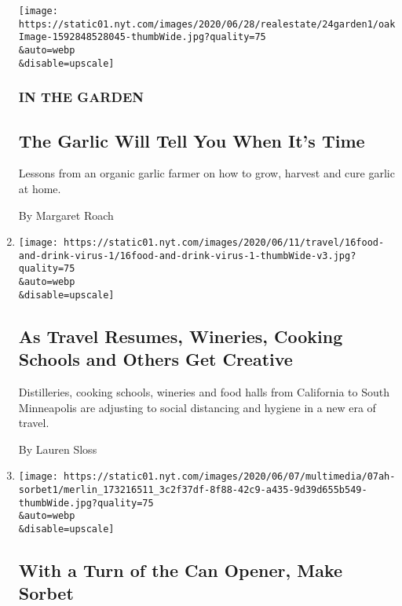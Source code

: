 \begin{enumerate}
  \texttt{[image: https://static01.nyt.com/images/2020/06/28/realestate/24garden1/oakImage-1592848528045-thumbWide.jpg?quality=75\\\&auto=webp\\\&disable=upscale]}

  \hypertarget{in-the-garden}{%
  \subsubsection{IN THE GARDEN}\label{in-the-garden}}

  \hypertarget{the-garlic-will-tell-you-when-its-time}{%
  \subsection{The Garlic Will Tell You When It's
  Time}\label{the-garlic-will-tell-you-when-its-time}}

  Lessons from an organic garlic farmer on how to grow, harvest and cure
  garlic at home.

  By Margaret Roach
\item
  \href{/2020/06/16/travel/wineries-distilleries-farm-stay-cooking-schools-virus.html}{}

  \texttt{[image: https://static01.nyt.com/images/2020/06/11/travel/16food-and-drink-virus-1/16food-and-drink-virus-1-thumbWide-v3.jpg?quality=75\\\&auto=webp\\\&disable=upscale]}

  \hypertarget{as-travel-resumes-wineries-cooking-schools-and-others-get-creative}{%
  \subsection{As Travel Resumes, Wineries, Cooking Schools and Others
  Get
  Creative}\label{as-travel-resumes-wineries-cooking-schools-and-others-get-creative}}

  Distilleries, cooking schools, wineries and food halls from California
  to South Minneapolis are adjusting to social distancing and hygiene in
  a new era of travel.

  By Lauren Sloss
\item
  \href{/2020/06/05/at-home/how-to-make-sorbet.html}{}

  \texttt{[image: https://static01.nyt.com/images/2020/06/07/multimedia/07ah-sorbet1/merlin\_173216511\_3c2f37df-8f88-42c9-a435-9d39d655b549-thumbWide.jpg?quality=75\\\&auto=webp\\\&disable=upscale]}

  \hypertarget{with-a-turn-of-the-can-opener-make-sorbet}{%
  \subsection{With a Turn of the Can Opener, Make
  Sorbet}\label{with-a-turn-of-the-can-opener-make-sorbet}}


\end{enumerate}

